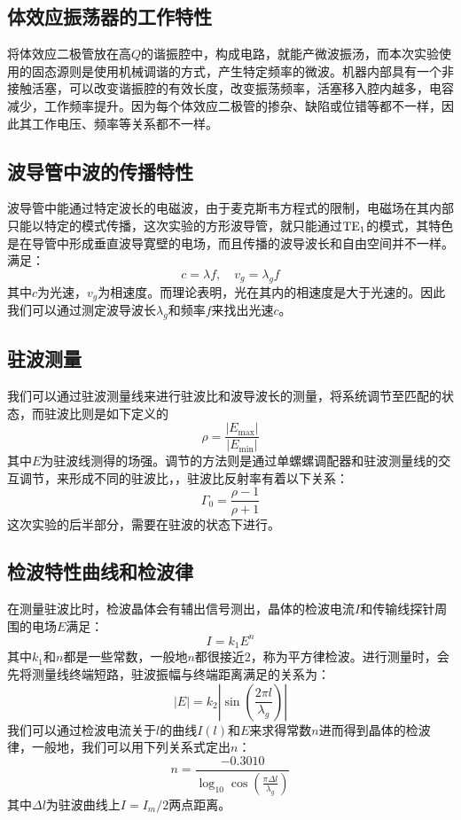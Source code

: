 \documentclass[font=fandol]{mpltx}
\begin{document}
\subsection{体效应振荡器的工作特性}
将体效应二极管放在高$Q$的谐振腔中，构成电路，就能产微波振汤，而本次实验使用的固态源则是使用机械调谐的方式，产生特定频率的微波。机器内部具有一个非接触活塞，可以改变谐振腔的有效长度，改变振荡频率，活塞移入腔内越多，电容减少，工作频率提升。因为每个体效应二极管的掺杂、缺陷或位错等都不一样，因此其工作电压、频率等关系都不一样。
\subsection{波导管中波的传播特性}
波导管中能通过特定波长的电磁波，由于麦克斯韦方程式的限制，电磁场在其内部只能以特定的模式传播，这次实验的方形波导管，就只能通过$\rm{TE_1}$的模式，其特色是在导管中形成垂直波导寛壁的电场，而且传播的波导波长和自由空间并不一样。满足：
$$c=\lambda f, \quad v_g=\lambda_gf$$
其中$c$为光速，$v_g$为相速度。而理论表明，光在其内的相速度是大于光速的。因此我们可以通过测定波导波长$\lambda_g$和频率$f$来找出光速$c$。
\subsection{驻波测量}
我们可以通过驻波测量线来进行驻波比和波导波长的测量，将系统调节至匹配的状态，而驻波比则是如下定义的
$$\rho=\frac{|E_{\max}|}{|E_{\min}|}$$
其中$E$为驻波线测得的场强。调节的方法则是通过单螺螺调配器和驻波测量线的交互调节，来形成不同的驻波比，，驻波比反射率有着以下关系：
$$\Gamma_0=\frac{\rho -1}{\rho+1}$$
这次实验的后半部分，需要在驻波的状态下进行。
\subsection{检波特性曲线和检波律}
在测量驻波比时，检波晶体会有辅出信号测出，晶体的检波电流$I$和传输线探针周围的电场$E$满足：
$$I=k_1E^n$$
其中$k_1$和$n$都是一些常数，一般地$n$都很接近$2$，称为平方律检波。进行测量时，会先将测量线终端短路，驻波振幅与终端距离满足的关系为：
$$|E|=k_2|\sin{(\frac{2\pi l}{\lambda_g})}|$$
我们可以通过检波电流关于$l$的曲线$I(l)$和$E$来求得常数$n$进而得到晶体的检波律，一般地，我们可以用下列关系式定出$n$：
$$n=\frac{-0.3010}{\log_{10}{\cos{(\frac{{\pi\Delta l}}{\lambda_g})}}}$$
其中$\Delta l$为驻波曲线上$I=I_m/2$两点距离。
\end{document}
